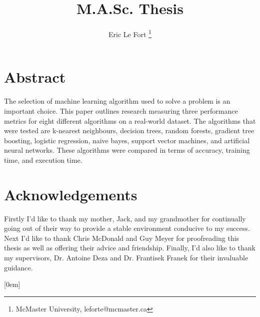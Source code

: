 \documentclass[12pt,twoside]{report}
\title{M.A.Sc. Thesis}
\author{Eric Le Fort
\thanks{McMaster University, leforte@mcmaster.ca}
}
\begin{document}
\pagestyle{empty}



\cleardoublepage
\pagestyle{fancy}


\chapter*{Abstract}
The selection of machine learning algorithm used to solve a problem is an important choice. This paper outlines research measuring three performance metrics for eight different algorithms on a real-world dataset. The algorithms that were tested are k-nearest neighbours, decision trees, random forests, gradient tree boosting, logistic regression, naive bayes, support vector machines, and artificial neural networks. These algorithms were compared in terms of accuracy, training time, and execution time.


\newpage
\chapter*{Acknowledgements}
Firstly I'd like to thank my mother, Jack, and my grandmother for continually going out of their way to provide a stable environment conducive to my success. Next I'd like to thank Chris McDonald and Guy Meyer for proofreading this thesis as well as offering their advice and friendship. Finally, I'd also like to thank my supervisors, Dr. Antoine Deza and Dr. Frantisek Franek for their invaluable guidance.



\color{black}
\pagestyle{fancy}
\tableofcontents
\listoftables
\listoffigures

\newpage
\pagestyle{plain}
\pagestyle{fancy}

\setcounter{figure}{0}
\setcounter{equation}{0}
\setcounter{table}{0}

\setcounter{figure}{0}
\setcounter{equation}{0}
\setcounter{table}{0}

\setcounter{figure}{0}
\setcounter{equation}{0}
\setcounter{table}{0}

\setcounter{figure}{0}
\setcounter{equation}{0}
\setcounter{table}{0}

\setcounter{figure}{0}
\setcounter{equation}{0}
\setcounter{table}{0}




\makeatletter
\def\@makechapterhead#1{
  {\parindent \z@ \raggedright \normalfont
    \ifnum \c@secnumdepth >\m@ne
        \huge\bfseries \@chapapp\space \thechapter:\\[-3mm]
        #1
        \par\nobreak
    \fi
    \vskip 20\p@
  }}
\def\@makeschapterhead#1{
  {\parindent \z@ \raggedright
    \normalfont
    \interlinepenalty\@M
    \Huge \bfseries  #1\par\nobreak
    \vskip 20\p@
  }}
\makeatother
{}
  [0em]{}{\appendixname\ \contentslabel{0em}\ \hspace*{0.8em} }{}
  {\titlerule*[1pc]{}\contentspage}
  
\end{document}
